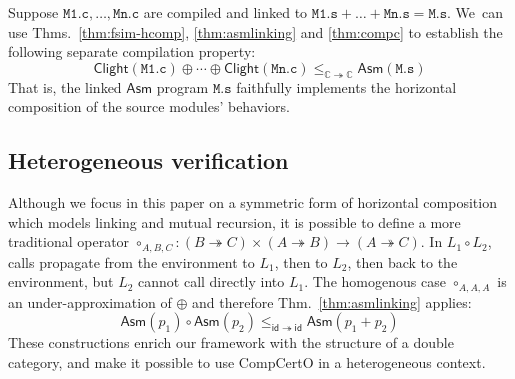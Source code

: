 \documentclass[sigplan,10pt,review]{acmart}
\newcommand{\kw}[1]{\ensuremath{ \mathsf{#1} }}
\begin{document}
\begin{corollary} \label{cor:sepcomp} %
Suppose
$\mathtt{M1.c}, \ldots, \mathtt{Mn.c}$
are compiled and linked to
$\mathtt{M1.s} + \ldots + \mathtt{Mn.s} = \mathtt{M.s}$.
We~can use
Thms.~\ref{thm:fsim-hcomp},
\ref{thm:asmlinking} and
\ref{thm:compc}
to establish the following separate compilation property:
\begin{equation}
  \label{eqn:sepcomp}
  \kw{Clight}(\mathtt{M1.c}) \oplus \cdots \oplus \kw{Clight}(\mathtt{Mn.c})
  \le_{\mathbb{C} \twoheadrightarrow \mathbb{C}}
  \kw{Asm}(\mathtt{M.s})
\end{equation}
That is,
the linked \kw{Asm} program
$\mathtt{M.s}$
faithfully implements
the horizontal composition of the source modules' behaviors.
\end{corollary}

\subsection{Heterogeneous verification}

Although we focus in this paper on a symmetric form
of horizontal composition
which models linking and mutual recursion,
it is possible to define a more traditional operator
$
  {\circ_{A,B,C}} : (B \twoheadrightarrow C) \times (A \twoheadrightarrow B)
    \rightarrow (A \twoheadrightarrow C)
$.
In $L_1 \circ L_2$,
calls propagate from the environment to $L_1$,
then to $L_2$,
then back to the environment,
but $L_2$ cannot call directly into $L_1$.
The homogenous case $\circ_{A,A,A}$ is
an under-approximation of $\oplus$
and therefore Thm.~\ref{thm:asmlinking} applies:
\[
  \kw{Asm}(p_1) \circ \kw{Asm}(p_2)
  \le_{\kw{id} \twoheadrightarrow \kw{id}}
  \kw{Asm}(p_1 + p_2)
\]
These constructions
enrich our framework with the structure of a double category,
and make it possible to use CompCertO
in a heterogeneous context.
\end{document}
